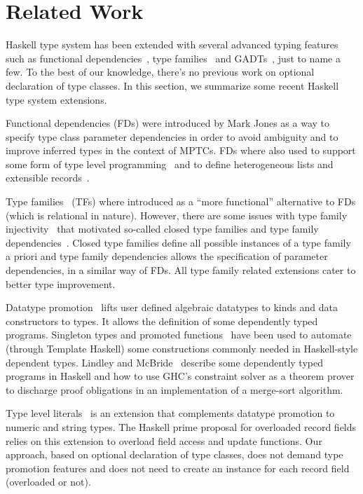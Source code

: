 \section{Related Work}
\label{sec:related-work}

Haskell type system has been extended with several advanced typing
features such as functional dependencies~\cite{Jones2008}, type
families~\cite{Chakravarty2005} and GADTs~\cite{Chen2016}, just to
name a few. To the best of our knowledge, there's no previous work on
optional declaration of type classes. In this section, we summarize
some recent Haskell type system extensions.

Functional dependencies (FDs) were introduced by Mark Jones as a way
to specify type class parameter dependencies in order to avoid
ambiguity and to improve inferred types in the context of MPTCs. FDs
where also used to support some form of type level
programming~\cite{Hallgren2000} and to define heterogeneous lists and
extensible records~\cite{KiselyovLS04}.

Type families~\cite{Chakravarty2005} (TFs) where introduced as a
``more functional'' alternative to FDs (which is relational in
nature). However, there are some issues with type family
injectivity~\cite{Eisenberg2014} that motivated so-called closed type
families and type family dependencies~\cite{Eisenberg2014a}. Closed
type families define all possible instances of a type family a priori
and type family dependencies allows the specification of parameter
dependencies, in a similar way of FDs.  All type family related
extensions cater to better type improvement.

Datatype promotion~\cite{Yorgey2012,Eisenberg2014} lifts user defined
algebraic datatypes to kinds and data constructors to types. It allows
the definition of some dependently typed programs.  Singleton types
and promoted functions~\cite{Eisenberg2012} have been used to automate
(through Template Haskell) some constructions commonly needed in
Haskell-style dependent types. Lindley and McBride~\cite{Lindley2013}
describe some dependently typed programs in Haskell and how to use
GHC's constraint solver as a theorem prover to discharge proof
obligations in an implementation of a merge-sort algorithm.

Type level literals~\cite{type-lits} is an extension that complements
datatype promotion to numeric and string types. The Haskell prime
proposal for overloaded record fields relies on this extension to
overload field access and update functions. Our approach, based on
optional declaration of type classes, does not demand type promotion
features and does not need to create an instance for each record field
(overloaded or not). 
